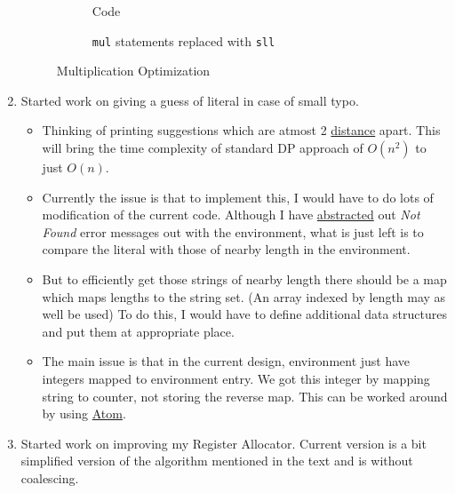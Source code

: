 \begin{enumerate}
	      \begin{figure}[t!]
		      \centering
		      \begin{subfigure}[t]{\textwidth}
			      \centering
			      \caption{Code}
			      \label{fig:mulopt1}
		      \end{subfigure}
		      \begin{subfigure}[t]{0.8\textwidth}
			      \centering
			      \caption{\texttt{mul} statements replaced with \texttt{sll}}
			      \label{fig:mulopt2}
		      \end{subfigure}
		      \caption{Multiplication Optimization}
	      \end{figure}
	\item Started work on giving a guess of literal in case of small typo.
	      \begin{itemize}
		      \item Thinking of printing suggestions which are atmost 2 \href{https://en.wikipedia.org/wiki/Edit_distance}{distance} apart. This will bring the time complexity of standard DP approach of $O(n^2)$ to just $O(n)$.
		      \item Currently the issue is that to implement this, I would have to do lots of modification of the current code. Although I have \href{https://github.com/sourabh2311/btp/commit/8f27478a3c51b9e41bef68961a28c400d4ef29dd}{abstracted} out \textit{Not Found} error messages out with the environment, what is just left is to compare the literal with those of nearby length in the environment.
		      \item But to efficiently get those strings of nearby length there should be a map which maps lengths to the string set. (An array indexed by length may as well be used) To do this, I would have to define additional data structures and put them at appropriate place.
		      \item The main issue is that in the current design, environment just have integers mapped to environment entry. We got this integer by mapping string to counter, not storing the reverse map. This can be worked around by using \href{http://www.cs.utah.edu/~mjones/sml-nj-lib/atom.html}{Atom}.
	      \end{itemize}
	\item Started work on improving my Register Allocator. Current version is a bit simplified version of the algorithm mentioned in the text and is without coalescing.
\end{enumerate}

